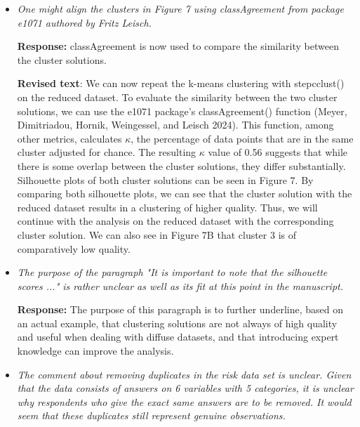 \documentclass[12pt]{article}
\begin{document}
\begin{itemize}
    \textbf{Response:} In Dolincar, 2003 is written: ``Please note that tourists staying in the capital cities of Austria are not included in this sample, as a different questionnaire was used for this group." Because it is unclear we have removed this part of the sentence.
   
    \item \textit{One might align the clusters in Figure 7 using classAgreement from package e1071 authored by Fritz Leisch.}

    \textbf{Response:} classAgreement is now used to compare the similarity between the cluster solutions.
    
    \textbf{Revised text}: We can now repeat the k-means clustering with stepcclust() on the reduced dataset. To evaluate the similarity between the two cluster solutions, we can use the e1071 package’s classAgreement() function (Meyer, Dimitriadou, Hornik, Weingessel, and Leisch 2024). This function, among other metrics, calculates $\kappa$, the percentage of data points that are in the same cluster adjusted for chance. The resulting $\kappa$ value of 0.56 suggests that while there is some overlap between the cluster solutions, they differ substantially. Silhouette plots of both cluster solutions can be seen in Figure 7. By comparing both silhouette plots, we can see that the cluster solution with the reduced dataset results in a clustering of higher quality. Thus, we will continue with the analysis on the reduced dataset with the corresponding cluster solution. We can also see in Figure 7B that cluster 3 is of comparatively low quality.
    
    \item \textit{The purpose of the paragraph "It is important to note that the silhouette scores ..." is rather unclear as well as its fit at this point in the manuscript.}

    \textbf{Response:} The purpose of this paragraph is to further underline, based on an actual example, that clustering solutions are not always of high quality and useful when dealing with diffuse datasets, and that introducing expert knowledge can improve the analysis.
    
    \item \textit{The comment about removing duplicates in the risk data set is unclear. Given that the data consists of answers on 6 variables with 5 categories, it is unclear why respondents who give the exact same answers are to be removed. It would seem that these duplicates still represent genuine observations.}


\end{itemize}
\end{document}
